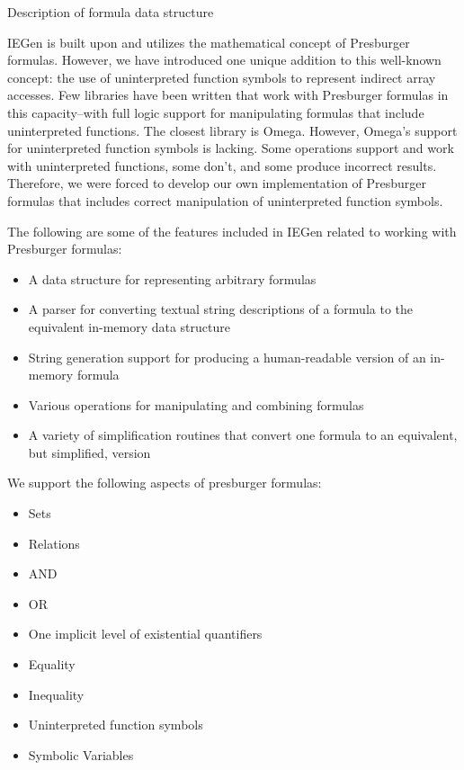 \documentclass[journal,10pt]{IEEEtran}
\begin{document}
\begin{section}{Description of formula data structure}

IEGen is built upon and utilizes the mathematical concept of Presburger formulas.
However, we have introduced one unique addition to this well-known concept: the use of uninterpreted function symbols to represent indirect array accesses.
Few libraries have been written that work with Presburger formulas in this capacity--with full logic support for manipulating formulas that include uninterpreted functions.
The closest library is Omega.
However, Omega's support for uninterpreted function symbols is lacking.
Some operations support and work with uninterpreted functions, some don't, and some produce incorrect results.
Therefore, we were forced to develop our own implementation of Presburger formulas that includes correct manipulation of uninterpreted function symbols.

The following are some of the features included in IEGen related to working with Presburger formulas:

\begin{itemize}
\item A data structure for representing arbitrary formulas
\item A parser for converting textual string descriptions of a formula to the equivalent in-memory data structure
\item String generation support for producing a human-readable version of an in-memory formula
\item Various operations for manipulating and combining formulas
\item A variety of simplification routines that convert one formula to an equivalent, but simplified, version
\end{itemize}

We support the following aspects of presburger formulas:

\begin{itemize}
\item Sets
\item Relations
\item AND
\item OR
\item One implicit level of existential quantifiers
\item Equality
\item Inequality
\item Uninterpreted function symbols
\item Symbolic Variables
\end{itemize}


\end{section}
\end{document}
